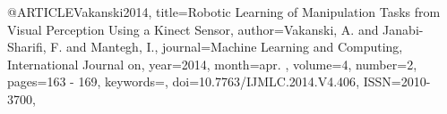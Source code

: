 @ARTICLE{Vakanski2014,
title={Robotic Learning of Manipulation Tasks from Visual Perception Using a Kinect Sensor},
author={Vakanski, A. and Janabi-Sharifi, F. and Mantegh, I.},
journal={Machine Learning and Computing, International Journal on}, 
year={2014},
month={apr. },
volume={4},
number={2},
pages={163 - 169},
keywords={},
doi={10.7763/IJMLC.2014.V4.406},
ISSN={2010-3700},}

